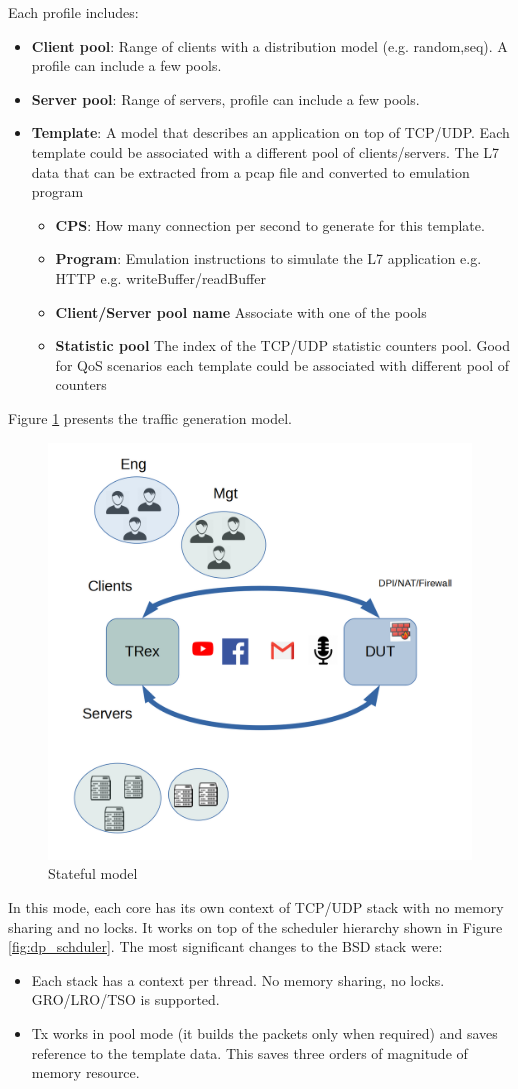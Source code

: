 \documentclass[conference]{IEEEtran}
\begin{document}
Each profile includes:
\begin{itemize}
  \item \textbf{Client pool}: Range of clients with a distribution model (e.g. random,seq). A profile can include a few pools.
  \item \textbf{Server pool}: Range of servers, profile can include a few pools. 
  \item \textbf{Template}: A model that describes an application on top of TCP/UDP. Each template could be associated with a different pool of clients/servers. The L7 data that can be extracted from a pcap file and converted to emulation program
  \begin{itemize}
  \item \textbf{CPS}: How many connection per second to generate for this template. 
  \item \textbf{Program}: Emulation instructions to simulate the L7 application e.g. HTTP e.g. writeBuffer/readBuffer
  \item \textbf{Client/Server pool name} Associate with one of the pools 
  \item \textbf{Statistic pool} The index of the TCP/UDP statistic counters pool. Good for QoS scenarios each template could be associated with different pool of counters 
  \end{itemize}
\end{itemize}

Figure \ref{fig:astf} presents the traffic generation model. 

\begin{figure}[h]
  \includegraphics[width=0.3
  \textwidth, center]{stateful_model.png}
  \caption{Stateful model}
  \label{fig:astf}
\end{figure}

In this mode, each core has its own context of TCP/UDP stack with no memory sharing and no locks. It works on top of the scheduler hierarchy shown in Figure \ref{fig:dp_schduler}.
The most significant changes to the BSD stack were:
\begin{itemize}
  \item Each stack has a context per thread. No memory sharing, no locks. GRO/LRO/TSO is supported. 
  \item Tx works in pool mode (it builds the packets only when required) and saves reference to the template data. This saves three orders of magnitude of memory resource.
\end{itemize}
\end{document}
